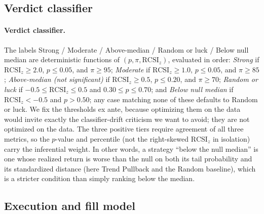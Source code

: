 \documentclass[preprint,12pt]{elsarticle}
\theoremstyle{definition}
\begin{document}
\subsection{Verdict classifier}

\paragraph{Verdict classifier.} The labels Strong / Moderate / Above-median / Random or luck / Below null median are deterministic functions of $(p, \pi, \mathrm{RCSI}_z)$, evaluated in order: \emph{Strong} if $\mathrm{RCSI}_z \ge 2.0$, $p\le 0.05$, and $\pi\ge 95$; \emph{Moderate} if $\mathrm{RCSI}_z\ge 1.0$, $p\le 0.05$, and $\pi\ge 85$; \emph{Above-median (not significant)} if $\mathrm{RCSI}_z\ge 0.5$, $p\le 0.20$, and $\pi\ge 70$; \emph{Random or luck} if $-0.5\le\mathrm{RCSI}_z\le 0.5$ and $0.30\le p\le 0.70$; and \emph{Below null median} if $\mathrm{RCSI}_z<-0.5$ and $p>0.50$; any case matching none of these defaults to Random or luck. We fix the thresholds ex ante, because optimizing them on the data would invite exactly the classifier-drift criticism we want to avoid; they are not optimized on the data. The three positive tiers require agreement of all three metrics, so the $p$-value and percentile (not the right-skewed $\mathrm{RCSI}_z$ in isolation) carry the inferential weight. In other words, a strategy ``below the null median'' is one whose realized return is worse than the null on both its tail probability and its standardized distance (here Trend Pullback and the Random baseline), which is a stricter condition than simply ranking below the median.

\subsection{Execution and fill model}
\label{app:execution}
\end{document}

